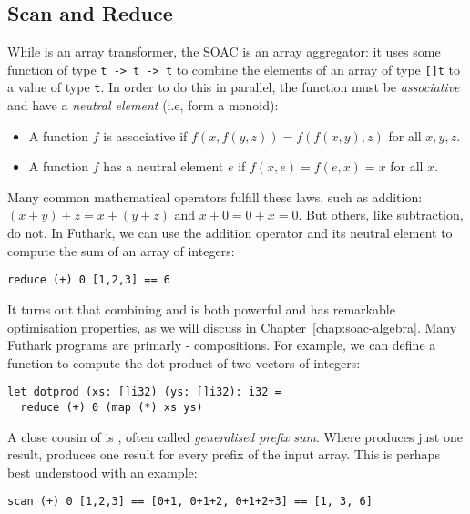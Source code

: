 \documentclass[oneside,11pt]{book}
\begin{document}
\subsection{Scan and Reduce}

While  is an array transformer, the  SOAC
is an array aggregator: it uses some function of type \texttt{t -> t
  -> t} to combine the elements of an array of type \texttt{[]t} to a
value of type \texttt{t}.  In order to do this in parallel, the
function must be \textit{associative} and have a \textit{neutral
  element} (i.e, form a monoid):

\begin{itemize}
\item A function $f$ is associative if $f(x,f(y,z)) = f(f(x,y),z)$ for
  all $x,y,z$.
\item A function $f$ has a neutral element $e$ if
  $f(x,e) = f(e,x) = x$ for all $x$.
\end{itemize}

Many common mathematical operators fulfill these laws, such as
addition: $(x+y)+z=x+(y+z)$ and $x+0=0+x=0$.  But others, like
subtraction, do not.  In Futhark, we can use the addition operator and
its neutral element to compute the sum of an array of integers:

\begin{lstlisting}
reduce (+) 0 [1,2,3] == 6
\end{lstlisting}

It turns out that combining  and  is both
powerful and has remarkable optimisation properties, as we will
discuss in Chapter~\ref{chap:soac-algebra}.  Many Futhark programs are
primarly - compositions.  For example, we
can define a function to compute the dot product of two vectors of
integers:

\begin{lstlisting}
let dotprod (xs: []i32) (ys: []i32): i32 =
  reduce (+) 0 (map (*) xs ys)
\end{lstlisting}

A close cousin of  is , often called
\textit{generalised prefix sum}.  Where  produces just
one result,  produces one result for every prefix of the
input array.  This is perhaps best understood with an example:

\begin{lstlisting}
scan (+) 0 [1,2,3] == [0+1, 0+1+2, 0+1+2+3] == [1, 3, 6]
\end{lstlisting}
\end{document}
